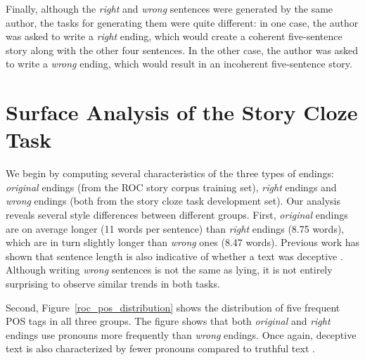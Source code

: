 \documentclass[11pt,a4paper]{article}
\newcommand{\figref}[1]{Figure~\ref{#1}}
\newcommand{\isection}[2]{\section{#1}\label{ssec:#2}}
\newcommand{\resolved}[1]{}
\newcommand{\ms}[1]{{\color{cyan}\{\textit{#1}\}$_{ms}$}}
\newcommand{\roy}[1]{{\color{orange}\textsc{[#1 --rs]}}}
\newcommand{\yc}[1]{{\color{bblue}\{\textit{#1}\}$_{yc}$}}
\newcommand{\nascomment}[1]{{\color{blue}\textsc{[#1 --nas]}}}
\renewcommand{\roy}[1]{{\color{orange}[#1 --rs]}}
\renewcommand{\roy}[1]{#1}
\renewcommand{\nascomment}[1]{}
\renewcommand{\yc}[1]{}
\begin{document}
Finally, although the {\it right} and {\it wrong} sentences were generated by the same author, 
the tasks for generating them were quite different: in one case, the author was asked to write a {\it right} ending, which would create a coherent five-sentence story along with the other four sentences. In the other case, the author was asked to write a {\it wrong} ending, which would result in an incoherent five-sentence story. 
 \resolved{In this work, we show that these differences are significant and
impose different writing styles on authors. \nascomment{this bit feels
  a little heavy and reptititive.}}

\isection{Surface Analysis of the Story Cloze Task}{Surface}
We begin by computing several characteristics of the three types of endings: {\it original} endings (from the ROC story corpus training set), {\it right} endings and {\it wrong} endings (both from the story cloze task development set).
Our analysis  reveals several style differences between different groups. 
First, {\it original} endings are on average longer (11 words per
sentence) than {\it right} endings (8.75 words), which are in turn
slightly longer than {\it wrong} ones (8.47 words). 
Previous work has shown that sentence length is also indicative of whether a text was deceptive \cite{yancheva2013automatic,qin2004exploratory}. 
Although writing {\it wrong} sentences is not the same as lying, it is not entirely surprising to observe similar trends in both tasks.

Second, \figref{roc_pos_distribution} shows the distribution of five frequent POS tags in all three groups. 
The figure shows that both {\it original} and {\it right} endings use pronouns more frequently than {\it wrong} endings.
Once again, deceptive text is also characterized by fewer pronouns compared to truthful text \cite{Newman:2003}.
 \resolved{\yc{Is there literature that may have shown that (1) pronouns correlate with coherent text, and/or (2) referencing characters by proper nouns shows a way of cognitive distancing...?}}
 \resolved{\ms{The proper noun thing is prolly related to the task design, which stated that people had to use at least one of the characters; research shows people usually use more other references when lying, but it's not clear whether there's a pronoun/proper noun distinction.}}
  \resolved{\roy{Good point! This is tricky. On the one hand, it hurts our story by saying that the difference is not really the general task by itself, but also the constraints put by  Nasrin et al. It also forces us to bash them some more. Or we can just ignore it...} }
  \resolved{\yc{Ok! I resolved all comments above and also commented out the comment on how wrong/right endings use more proper nouns compared to the original endings. I think it's the best not to talk about this.}}
\end{document}
